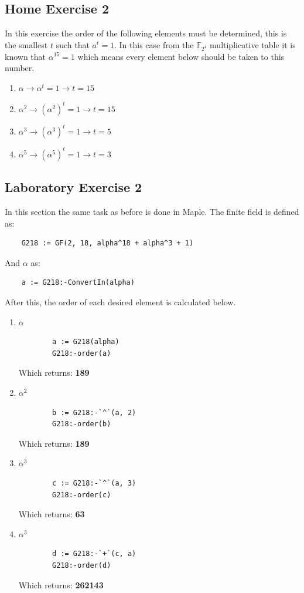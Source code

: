 \documentclass{article}
\begin{document}
\subsection{Home Exercise 2}
In this exercise the order of the following elements must be determined, this is the smallest $t$ such that $a^t = 1$. In this case from the $\mathbb F_{2^4}$ multiplicative table it is known that $\alpha^{15} = 1$ which means every element below should be taken to this number.
\begin{enumerate}
    \item $\alpha \rightarrow \alpha^t = 1 \rightarrow t = 15$
    \item $\alpha^2 \rightarrow (\alpha^2)^t = 1 \rightarrow t = 15$
    \item $\alpha^3 \rightarrow (\alpha^3)^t = 1 \rightarrow t = 5$
    \item $\alpha^5 \rightarrow (\alpha^5)^t = 1 \rightarrow t = 3$
    
\end{enumerate}
\subsection{Laboratory Exercise 2}
In this section the same task as before is done in Maple. The finite field is defined as:
\begin{verbatim}
    G218 := GF(2, 18, alpha^18 + alpha^3 + 1)
\end{verbatim}
And $\alpha$ as:
\begin{verbatim}
    a := G218:-ConvertIn(alpha)
\end{verbatim}
After this, the order of each desired element is calculated below.
\begin{enumerate}
    \item $\alpha$ \\
    \begin{verbatim}
        a := G218(alpha)
        G218:-order(a)
    \end{verbatim}
    Which returns: \textbf{189}
    \item $\alpha^2$ \\
    \begin{verbatim}
        b := G218:-`^`(a, 2)
        G218:-order(b)
    \end{verbatim}
    Which returns: \textbf{189}
    \item $\alpha^3$ \\
    \begin{verbatim}
        c := G218:-`^`(a, 3)
        G218:-order(c)
    \end{verbatim}
    Which returns: \textbf{63}
    \item $\alpha^3$ \\
    \begin{verbatim}
        d := G218:-`+`(c, a)
        G218:-order(d)
    \end{verbatim}
    Which returns: \textbf{262143}
\end{enumerate}
\end{document}

